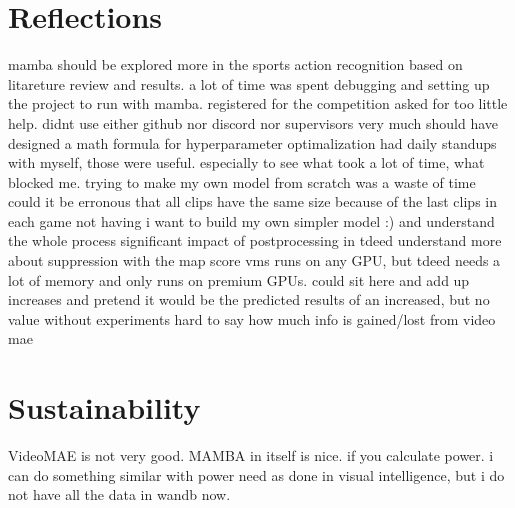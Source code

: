 \section{Reflections}
mamba should be explored more in the sports action recognition based on litareture review and results. 
a lot of time was spent debugging and setting up the project to run with mamba. 
registered for the competition
asked for too little help. didnt use either github nor discord nor supervisors very much
should have designed a math formula for hyperparameter optimalization
had daily standups with myself, those were useful. especially to see what took a lot of time, what blocked me.
trying to make my own model from scratch was a waste of time
could it be erronous that all clips have the same size because of the last clips in each game not having
i want to build my own simpler model :) and understand the whole process
significant impact of postprocessing in tdeed
understand more about suppression with the map score
vms runs on any GPU, but tdeed needs a lot of memory and only runs on premium GPUs.
could sit here and add up increases and pretend it would be the predicted results of an increased, but no value without experiments
hard to say how much info is gained/lost from video mae

\section{Sustainability}
VideoMAE is not very good. MAMBA in itself is nice. if you calculate power. i can do something similar with power need as done in visual intelligence, but i do not have all the data in wandb now. 